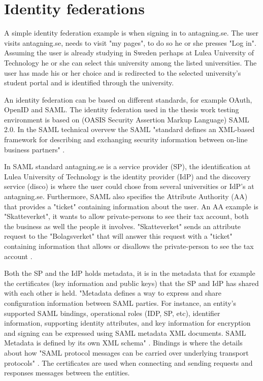 \section{Identity federations}
A simple identity federation example is when signing in to antagning.se. 
The user visits antagning.se, needs to visit "my pages", to do so he or she presses "Log in". 
Assuming the user is already studying in Sweden perhaps at Lulea University of Technology he or 
she can select this university among the listed universities. 
The user has made his or her choice and is redirected to the selected university's student portal and is identified through the university. 

An identity federation can be based on different standards, for example OAuth, OpenID and SAML. 
The identity federation used in the thesis work testing environment is based on (OASIS Security Assertion Markup Language) SAML 2.0. 
In the SAML technical overvew the SAML "standard defines an XML-based framework for describing and exchanging security information 
between on-line business partners"
\cite[p.~8]{pdf:oasis-open}.    

In SAML standard antagning.se is a service provider (SP)\cite[p.~11]{pdf:oasis-open-glossary}, 
the identification at Lulea University of Technology is the identity provider (IdP) \cite[p.~7]{pdf:oasis-open-glossary}
and the discovery service (disco) is where the user could chose from several 
universities or IdP's at antagning.se. Furthermore, SAML also specifies the Attribute Authority (AA) that provides 
a "ticket" containing information about the user. An AA example is "Skatteverket", it wants to 
allow private-persons to see their tax account, both the business as well the people it involves. 
"Skatteverket" sends an attribute request to the "Bolagsverket" that will answer this request 
with a "ticket" containing information that allows or disallows the private-person to see the tax account \cite[p.~284]{pdf:SOU}.

Both the SP and the IdP holds metadata, it is in the metadata that for example the certificates 
(key information and public keys) that the SP and IdP has shared with each other is held. 
"Metadata defines a way to express and share configuration information between SAML parties. 
For instance, an entity's supported SAML bindings, operational roles (IDP, SP, etc), identifier information, 
supporting identity attributes, and key information for encryption and signing can be expressed using SAML 
metadata XML documents. SAML Metadata is defined by its own XML schema" \cite[p.~16]{pdf:oasis-open}. 
Bindings is where the details about how "SAML protocol messages can be carried over underlying transport protocols" 
\cite[p.~18]{pdf:oasis-open}.  
The certificates are used when connecting and sending requests and responses messages between the entities.

